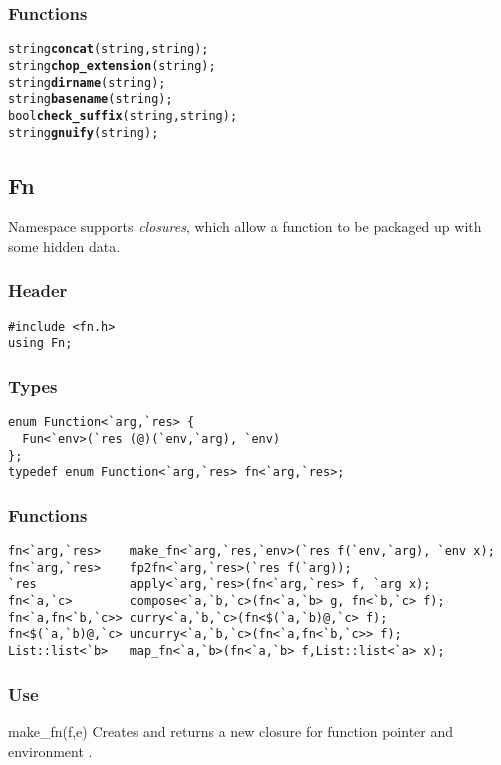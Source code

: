 \subsubsection*{Functions}
\begin{alltt}
string \textbf{concat}(string, string);
string \textbf{chop_extension}(string);
string \textbf{dirname}(string);
string \textbf{basename}(string);
bool   \textbf{check_suffix}(string, string);
string \textbf{gnuify}(string);
\end{alltt}

\subsection{Fn}

Namespace  supports \emph{closures}, which allow a function to
be packaged up with some hidden data.

\subsubsection*{Header}
\begin{verbatim}
#include <fn.h>
using Fn;
\end{verbatim}

\subsubsection*{Types}
\begin{verbatim}
enum Function<`arg,`res> {
  Fun<`env>(`res (@)(`env,`arg), `env)
};
typedef enum Function<`arg,`res> fn<`arg,`res>;
\end{verbatim}

\subsubsection*{Functions}
\begin{verbatim}
fn<`arg,`res>    make_fn<`arg,`res,`env>(`res f(`env,`arg), `env x);
fn<`arg,`res>    fp2fn<`arg,`res>(`res f(`arg));
`res             apply<`arg,`res>(fn<`arg,`res> f, `arg x);
fn<`a,`c>        compose<`a,`b,`c>(fn<`a,`b> g, fn<`b,`c> f);
fn<`a,fn<`b,`c>> curry<`a,`b,`c>(fn<$(`a,`b)@,`c> f);
fn<$(`a,`b)@,`c> uncurry<`a,`b,`c>(fn<`a,fn<`b,`c>> f);
List::list<`b>   map_fn<`a,`b>(fn<`a,`b> f,List::list<`a> x);
\end{verbatim}

\subsubsection*{Use}
\begin{defun}{make_fn}{(f,e)}
Creates and returns a new closure for function pointer  and environment
.
\end{defun}

